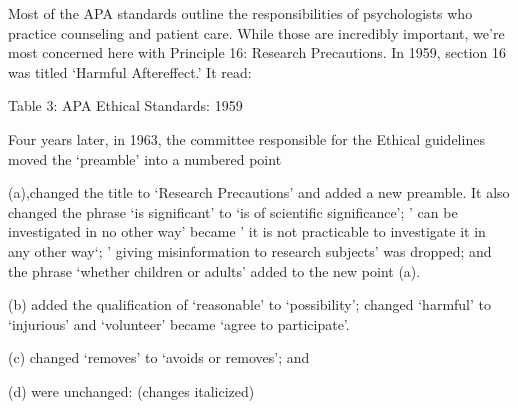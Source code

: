 Most of the APA standards outline the responsibilities of psychologists who practice counseling and patient care. While those are incredibly important, we're most concerned here with Principle 16: Research Precautions. In 1959, section 16 was titled `Harmful Aftereffect.' It read:

\noindent{}
 

Table 3: APA Ethical Standards: 1959

Four years later, in 1963, the committee responsible for the Ethical guidelines moved the `preamble' into a numbered point 

(a),changed the title to `Research Precautions' and added a new preamble. It also changed the phrase `is significant' to `is of scientific significance'; ' can be investigated in no other way' became ' it is not practicable to investigate it in any other way`; ' giving misinformation to research subjects' was dropped; and the phrase `whether children or adults' added to the new point (a). 

(b) added the qualification of `reasonable' to `possibility'; changed `harmful' to `injurious' and `volunteer' became `agree to participate'. 

(c) changed `removes' to `avoids or removes'; and 

(d) were unchanged: (changes italicized)

